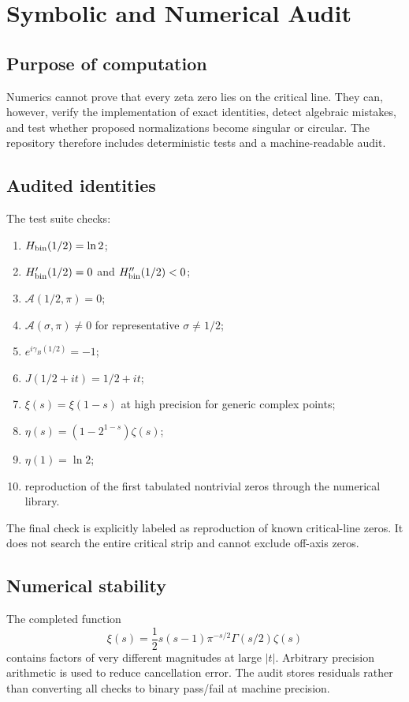 \chapter{Symbolic and Numerical Audit}
\label{ch:audit}

\section{Purpose of computation}
Numerics cannot prove that every zeta zero lies on the critical line. They can, however, verify the implementation of exact identities, detect algebraic mistakes, and test whether proposed normalizations become singular or circular. The repository therefore includes deterministic tests and a machine-readable audit.

\section{Audited identities}
The test suite checks:
\begin{enumerate}
\item $H_{\mathrm{bin}}(1/2)=\ln2$;
\item $H_{\mathrm{bin}}'(1/2)=0$ and $H_{\mathrm{bin}}''(1/2)<0$;
\item $\mathcal A(1/2,\pi)=0$;
\item $\mathcal A(\sigma,\pi)\neq0$ for representative $\sigma\neq1/2$;
\item $e^{i\gamma_B(1/2)}=-1$;
\item $J(1/2+it)=1/2+it$;
\item $\xi(s)=\xi(1-s)$ at high precision for generic complex points;
\item $\eta(s)=(1-2^{1-s})\zeta(s)$;
\item $\eta(1)=\ln2$;
\item reproduction of the first tabulated nontrivial zeros through the numerical library.
\end{enumerate}

The final check is explicitly labeled as reproduction of known critical-line zeros. It does not search the entire critical strip and cannot exclude off-axis zeros.

\section{Numerical stability}
The completed function
\begin{equation}
\xi(s)=\frac12s(s-1)\pi^{-s/2}\Gamma(s/2)\zeta(s)
\end{equation}
contains factors of very different magnitudes at large $|t|$. Arbitrary precision arithmetic is used to reduce cancellation error. The audit stores residuals rather than converting all checks to binary pass/fail at machine precision.

